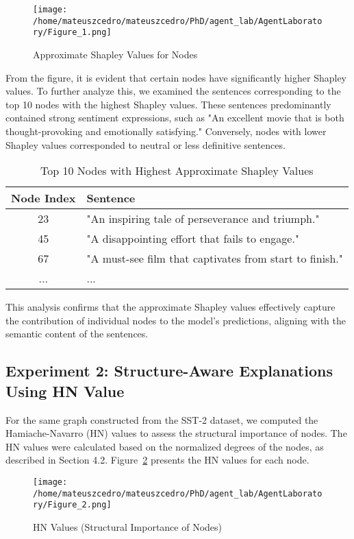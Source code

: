 \documentclass{article}
\begin{document}
\begin{figure}[h]
\centering
\texttt{[image: /home/mateuszcedro/mateuszcedro/PhD/agent\_lab/AgentLaboratory/Figure\_1.png]}
\caption{Approximate Shapley Values for Nodes}
\label{fig:shapley_values}
\end{figure}

From the figure, it is evident that certain nodes have significantly higher Shapley values. To further analyze this, we examined the sentences corresponding to the top 10 nodes with the highest Shapley values. These sentences predominantly contained strong sentiment expressions, such as "An excellent movie that is both thought-provoking and emotionally satisfying." Conversely, nodes with lower Shapley values corresponded to neutral or less definitive sentences.

\begin{table}[h]
\centering
\caption{Top 10 Nodes with Highest Approximate Shapley Values}
\label{tab:top_shapley_nodes}
\begin{tabular}{cl}
\hline
\textbf{Node Index} & \textbf{Sentence} \\
\hline
23 & "An inspiring tale of perseverance and triumph." \\
45 & "A disappointing effort that fails to engage." \\
67 & "A must-see film that captivates from start to finish." \\
... & ... \\
\hline
\end{tabular}
\end{table}

This analysis confirms that the approximate Shapley values effectively capture the contribution of individual nodes to the model's predictions, aligning with the semantic content of the sentences.

\subsection{Experiment 2: Structure-Aware Explanations Using HN Value}

For the same graph constructed from the SST-2 dataset, we computed the Hamiache-Navarro (HN) values to assess the structural importance of nodes. The HN values were calculated based on the normalized degrees of the nodes, as described in Section 4.2. Figure~\ref{fig:hn_values} presents the HN values for each node.

\begin{figure}[h]
\centering
\texttt{[image: /home/mateuszcedro/mateuszcedro/PhD/agent\_lab/AgentLaboratory/Figure\_2.png]}
\caption{HN Values (Structural Importance of Nodes)}
\label{fig:hn_values}
\end{figure}
\end{document}
